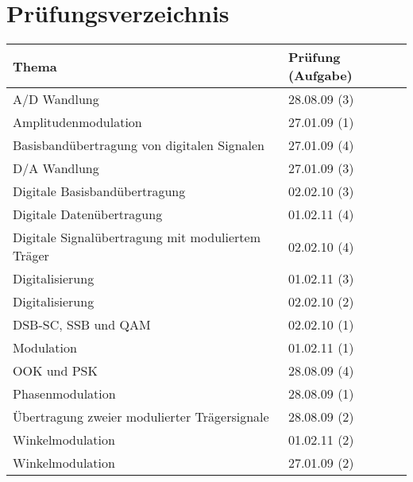 \section{Prüfungsverzeichnis}

\begin{tabular}{|l|l|}
	\hline
	\textbf{Thema} & \textbf{Prüfung (Aufgabe)}\\
	\hline
	A/D Wandlung & 28.08.09 (3)\\
	\hline
	Amplitudenmodulation & 27.01.09 (1) \\
	\hline
	Basisbandübertragung von digitalen Signalen & 27.01.09 (4)\\
	\hline
	D/A Wandlung & 27.01.09 (3)\\
	\hline
	Digitale Basisbandübertragung & 02.02.10 (3)\\
	\hline
	Digitale Datenübertragung & 01.02.11 (4)\\
	\hline
	Digitale Signalübertragung mit moduliertem Träger & 02.02.10 (4)\\
	\hline
	Digitalisierung & 01.02.11 (3)\\
	\hline
	Digitalisierung & 02.02.10 (2)\\
	\hline
	DSB-SC, SSB und QAM & 02.02.10 (1)\\
	\hline
	Modulation & 01.02.11 (1)\\
	\hline
	OOK und PSK & 28.08.09 (4)\\
	\hline
	Phasenmodulation & 28.08.09 (1)\\
	\hline
	Übertragung zweier modulierter Trägersignale & 28.08.09 (2)\\
	\hline
	Winkelmodulation & 01.02.11 (2)\\
	\hline
	Winkelmodulation & 27.01.09 (2)\\
	\hline
\end{tabular}